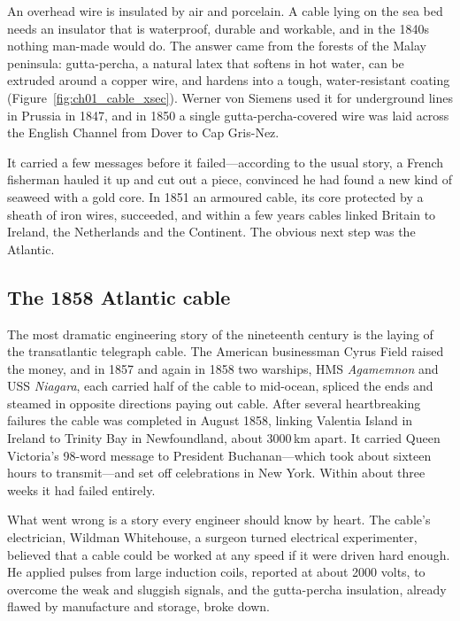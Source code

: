 An overhead wire is insulated by air and porcelain. A cable lying on the sea bed needs an insulator
that is waterproof, durable and workable, and in the 1840s nothing man-made would do. The answer came
from the forests of the Malay peninsula: gutta-percha, a natural latex that softens in hot water, can
be extruded around a copper wire, and hardens into a tough, water-resistant coating (Figure~\ref{fig:ch01_cable_xsec}). Werner von
Siemens used it for underground lines in Prussia in 1847, and in 1850 a single gutta-percha-covered
wire was laid across the English Channel from Dover to Cap Gris-Nez.


It carried a few messages before it failed---according to the usual story, a French fisherman hauled
it up and cut out a piece, convinced he had found a new kind of seaweed with a gold core. In 1851 an
armoured cable, its core protected by a sheath of iron wires, succeeded, and within a few years cables
linked Britain to Ireland, the Netherlands and the Continent. The obvious next step was the
Atlantic.

\subsection{The 1858 Atlantic cable}

The most dramatic engineering story of the nineteenth century is the laying of the transatlantic
telegraph cable. The American businessman Cyrus Field raised the money, and in 1857 and again in
1858 two warships, HMS \emph{Agamemnon} and USS \emph{Niagara}, each carried half of the cable to
mid-ocean, spliced the ends and steamed in opposite directions paying out cable. After several
heartbreaking failures the cable was completed in August 1858, linking Valentia Island in Ireland to
Trinity Bay in Newfoundland, about 3000\,km apart. It carried Queen Victoria's 98-word message to
President Buchanan---which took about sixteen hours to transmit---and set off celebrations in New York.
Within about three weeks it had failed entirely.

What went wrong is a story every engineer should know by heart. The cable's electrician, Wildman
Whitehouse, a surgeon turned electrical experimenter, believed that a cable could be worked at any
speed if it were driven hard enough. He applied pulses from large induction coils, reported at about
2000 volts, to overcome the weak and sluggish signals, and the gutta-percha insulation, already
flawed by manufacture and storage, broke down.


